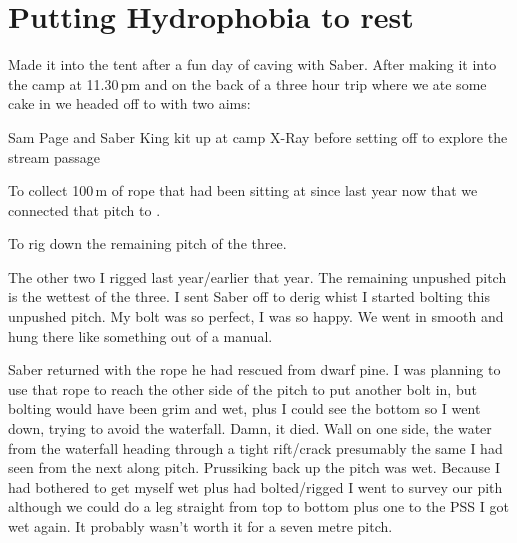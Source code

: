 \section{Putting Hydrophobia to rest}

Made it into the tent after a fun day of caving with Saber. After making it into the camp at 11.30\,pm and on the back of a three hour trip where we ate some cake in  we headed off to   with two aims: 

\begin{marginfigure}
\centering
\vspace{100pt}
\label{sam toothbrush}
\caption{Sam Page and Saber King kit up at camp X-Ray before setting off to explore the \protect{} stream passage }
\end{marginfigure}


\begin{citemize} 
 \item To collect 100\,m of rope that had been sitting at  since last year now that we connected that pitch to .  
 \item To rig down the remaining  pitch of the three. 
 \end{citemize}
 
 The other two I rigged last year/earlier that year.  The remaining unpushed pitch is the wettest of the three. I sent Saber off to derig  whist I started bolting this unpushed pitch. My bolt was so perfect, I was so happy. We went in smooth and hung there like something out of a manual. 

Saber returned with the rope he had rescued from dwarf pine.  I was planning to use that rope to reach the other side of the pitch  to put another bolt in, but bolting would have been grim and wet, plus I could see the bottom so I went down, trying to avoid the waterfall. Damn, it died. Wall on one side, the water from the waterfall heading through a tight rift/crack presumably the same I had seen from the next along pitch. Prussiking back up the pitch was wet. Because I had bothered to get myself wet plus had bolted/rigged I went to survey our pith although we could do a leg straight from top to bottom plus one to the  PSS I got wet again. It probably wasn't worth it for a seven metre pitch.

